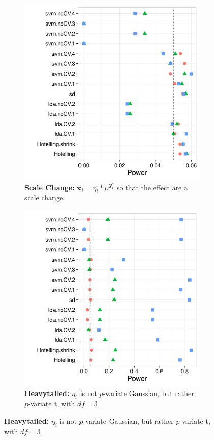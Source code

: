 \documentclass[12pt,a4paper]{article}
\newcommand{\rv}[1]{\mathbf{#1}} %
\newcommand{\x}{\rv x} %
\newcommand{\y}{\rv y} %
\newcommand{\mycaption}{Simulation details in Appendix~\ref{apx:simulation_details} except the changes in the sub-captions.}
\begin{document}
\begin{figure}[h]
\centering
\caption{\mycaption}	
	\begin{subfigure}{.5\textwidth}
	  \centering
	  \includegraphics[width=1\linewidth]{"art/2016-07-30 10:33:05"}
	  \caption{\textbf{Scale Change:} $\x_i =  \eta_i * \mu^ {\y^*_i}$ so that the effect are a scale change.}  
	\label{fig:scale_change}
	\end{subfigure}%
	\begin{subfigure}{.5\textwidth}
	  \centering
	  \includegraphics[width=1\linewidth]{"art/2016-08-04 19:32:17"}
	  \caption{\textbf{Heavytailed:} $\eta_i$ is not $p$-variate Gaussian, but rather $p$-variate t, with $df=3$ .  } 
	\label{fig:t_null}
	\end{subfigure}
\end{figure}
\end{document}

